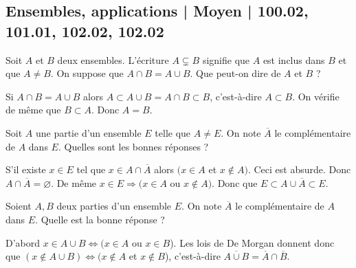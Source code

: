 \subsection{Ensembles, applications | Moyen | 100.02, 101.01, 102.02, 102.02}


\begin{question}
Soit $A$ et $B$ deux ensembles. L'écriture $A\varsubsetneq B$ signifie que $A$ est inclus dans $B$ et que $A\neq B$. On suppose que $A\cap B=A\cup B$. Que peut-on dire de $A$ et $B$ ?
\begin{answers}  
\end{answers}
\begin{explanations}
Si $A\cap B=A\cup B$ alors $A\subset A\cup B=A \cap B\subset B$, c'est-à-dire $A\subset B$. On vérifie de même que $B\subset A$. Donc $A=B$.
\end{explanations}
\end{question}


\begin{question}
Soit $A$ une partie d'un ensemble $E$ telle que $A\neq E$. On note $\overline{A}$ le complémentaire de $A$ dans $E$. Quelles sont les bonnes réponses ?
\begin{answers}  
\end{answers}
\begin{explanations}
S'il existe $x\in E$ tel que $x\in A\cap \overline{A}$ alors $(x\in A$ et $x\notin A)$. Ceci est absurde. Donc $A\cap \overline{A}=\varnothing$. De même $x\in E\Rightarrow (x\in A$ ou $x\notin A)$. Donc que $E\subset A\cup\overline{A}\subset E$.
\end{explanations}
\end{question}


\begin{question}
Soient $A,B$ deux parties d'un ensemble $E$. On note $\overline{A}$ le complémentaire de $A$ dans $E$. Quelle est la bonne réponse ?
\begin{answers}  
\end{answers}
\begin{explanations}
D'abord $x\in A\cup B \Leftrightarrow (x\in A$ ou $x\in B$). Les lois de De Morgan donnent donc que $(x\notin A\cup B)\Leftrightarrow (x\notin A$ et $x\notin B$), c'est-à-dire $\overline{A\cup B}=\overline{A}\cap \overline{B}$.
\end{explanations}
\end{question}


